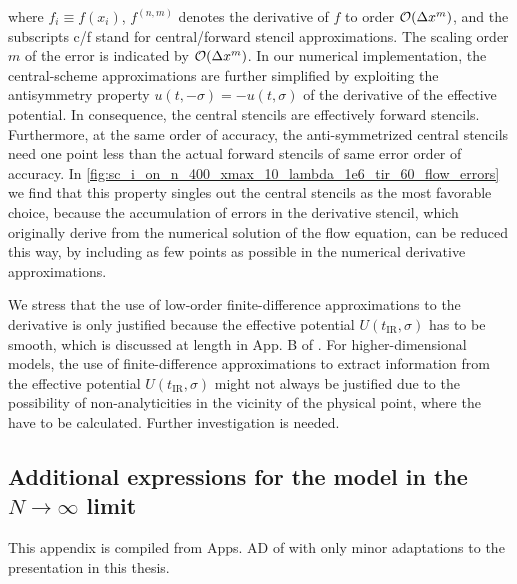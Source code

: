 where $f_i \equiv f ( x_i )$, $f^{(n,m)}$ denotes the  derivative of $f$ to order $ \mathcal{O} ( \Delta x^m )$, and the subscripts c/f stand for central/forward stencil approximations.
The scaling order $m$ of the error is indicated by $\mathcal{O}(\Delta x^m)$.
In our numerical implementation, the central-scheme approximations are further simplified by exploiting the antisymmetry property $u ( t, - \sigma ) = - u ( t, \sigma )$ of the derivative of the effective potential.
In consequence, the central stencils are effectively forward stencils.
Furthermore, at the same order of accuracy, the anti-symmetrized central stencils need one point less than the actual forward stencils of same error order of accuracy.
In \cref{fig:sc_i_on_n_400_xmax_10_lambda_1e6_tir_60_flow_errors} we find that this property singles out the central stencils as the most favorable choice, because the accumulation of errors in the derivative stencil, which originally derive from the numerical solution of the flow equation, can be reduced this way, by including as few points as possible in the numerical derivative approximations.

We stress that the use of low-order finite-difference approximations to the derivative is only justified because the effective \ir{} potential $U ( t_\mathrm{IR}, \sigma )$ has to be smooth, which is discussed at length in App. B of .
For higher-dimensional models, the use of finite-difference approximations to extract information from the \ir{} effective potential $U ( t_\mathrm{IR}, \sigma )$ might not always be justified due to the possibility of non-analyticities in the vicinity of the physical point, where the \ipi{} \nptFunctions{} have to be calculated. Further investigation is needed.

\subsection{Additional expressions for the \ON{} model in the \texorpdfstring{$N\rightarrow\infty$}{infinite-N} limit}
\begin{disclaimer}
	This appendix is compiled from Apps. A\dash{}D of  with only minor adaptations to the presentation in this thesis.
\end{disclaimer}


